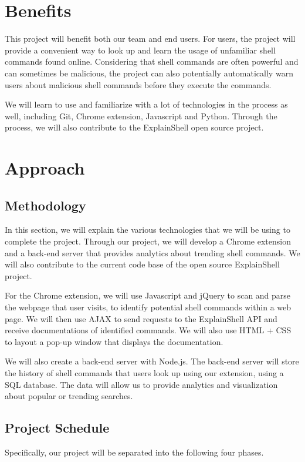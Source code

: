 \documentclass[11pt]{article}
\begin{document}
\section{Benefits}

This project will benefit both our team and end users. For users, the project will provide a convenient way to look up and learn the usage of unfamiliar shell commands found online. Considering that shell commands are often powerful and can sometimes be malicious, the project can also potentially automatically warn users about malicious shell commands before they execute the commands. 

We will learn to use and familiarize with a lot of technologies in the process as well, including Git, Chrome extension, Javascript and Python. Through the process, we will also contribute to the ExplainShell open source project.

\section{Approach}
\subsection{Methodology}

In this section, we will explain the various technologies that we will be using to complete the project. Through our project, we will develop a Chrome extension and a back-end server that provides analytics about trending shell commands. We will also contribute to the current code base of the open source ExplainShell project. 

For the Chrome extension, we will use Javascript and jQuery to scan and parse the webpage that user visits, to identify potential shell commands within a web page. We will then use AJAX to send requests to the ExplainShell API and receive documentations of identified commands. We will also use HTML + CSS to layout a pop-up window that displays the documentation. 

We will also create a back-end server with Node.js. The back-end server will store the history of shell commands that users look up using our extension, using a SQL database. The data will allow us to provide analytics and visualization about popular or trending searches.

\subsection{Project Schedule}
Specifically, our project will be separated into the following four phases. 
\end{document}
